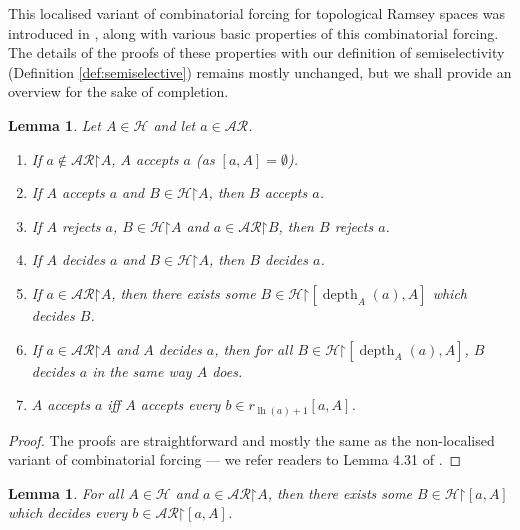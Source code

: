 \documentclass[10pt,a4paper]{amsart}
\theoremstyle{plain}
\numberwithin{equation}{section}
\newtheorem{lemma}[theorem]{Lemma}
\theoremstyle{definition}
\newcommand{\func}{\operatorname}
\newcommand{\cal}{\mathcal}
\newcommand{\restrictedto}{\mathord{\upharpoonright}}
\renewcommand{\H}{\cal{H}}
\newcommand{\lh}{\func{lh}}
\newcommand{\depth}{\func{depth}}
\begin{document}
This localised variant of combinatorial forcing for topological Ramsey spaces was introduced in \cite{DMN15}, along with various basic properties of this combinatorial forcing. The details of the proofs of these properties with our definition of semiselectivity (Definition \ref{def:semiselective}) remains mostly unchanged, but we shall provide an overview for the sake of completion.

\begin{lemma}
\label{lem:combinatorial.forcing.basics}
    Let $A \in \H$ and let $a \in \cal{AR}$.
    \begin{enumerate}
        \item If $a \notin\cal{AR}\restrictedto A$, $A$ accepts $a$ (as $[a,A] = \emptyset$).
        
        \item If $A$ accepts $a$ and $B \in \H\restrictedto A$, then $B$ accepts $a$.
        
        \item If $A$ rejects $a$, $B \in \H\restrictedto A$ and $a \in \cal{AR}\restrictedto B$, then $B$ rejects $a$.
        
        \item If $A$ decides $a$ and $B \in \H\restrictedto A$, then $B$ decides $a$.
        
        \item If $a \in \cal{AR}\restrictedto A$, then there exists some $B \in \H\restrictedto[\depth_A(a),A]$ which decides $B$.
        
        \item If $a \in \cal{AR}\restrictedto A$ and $A$ decides $a$, then for all $B \in \H\restrictedto[\depth_A(a),A]$, $B$ decides $a$ in the same way $A$ does.
        
        \item $A$ accepts $a$ iff $A$ accepts every $b \in r_{\lh(a)+1}[a,A]$.
    \end{enumerate}
\end{lemma}

\begin{proof}
    The proofs are straightforward and mostly the same as the non-localised variant of combinatorial forcing --- we refer readers to Lemma 4.31 of \cite{T10}.
\end{proof}

\begin{lemma}
\label{lem:decisive.reduction}
    For all $A \in \H$ and $a \in \cal{AR}\restrictedto A$, then there exists some $B \in \H\restrictedto[a,A]$ which decides every $b \in \cal{AR}\restrictedto[a,A]$.
\end{lemma}
\end{document}
